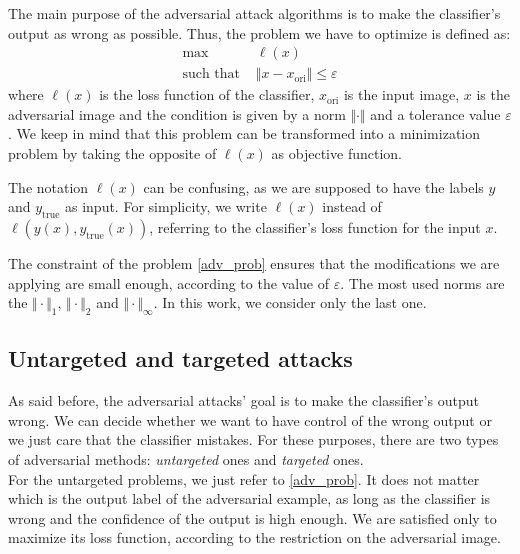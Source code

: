 \documentclass[10pt,twocolumn,letterpaper, english]{article}
\theoremstyle{definition}
\theoremstyle{plain}
\theoremstyle{plain}
\theoremstyle{plain}
\theoremstyle{plain}
\theoremstyle{remark}
\theoremstyle{remark}
\theoremstyle{definition}
\theoremstyle{definition}
\theoremstyle{definition}
\theoremstyle{definition}
\renewcommand{\epsilon}{\varepsilon}
\begin{document}
The main purpose of the adversarial attack algorithms is to make the classifier's output as wrong as possible. 
Thus, the problem we have to optimize is defined as: 
\begin{align}
    \max \, &\ell(x) \label{adv_prob} \\
    \text{such that } & \Vert x - x_{\text{ori}} \Vert \le \epsilon \nonumber
\end{align}
where $\ell(x)$ is the loss function of the classifier, $x_{\text{ori}}$ is the input image, $x$ is the adversarial image and the condition is given by a norm $\Vert \cdot \Vert$ and a tolerance value $\epsilon$. 
We keep in mind that this problem can be transformed into a minimization problem by taking the opposite of $\ell(x)$ as objective function. 

The notation $\ell(x)$ can be confusing, as we are supposed to have the labels $y$ and $y_{\text{true}}$ as input. 
For simplicity, we write $\ell(x)$ instead of $\ell(y(x), y_{\text{true}}(x))$, referring to the classifier's loss function for the input $x$. 

The constraint of the problem \ref{adv_prob} ensures that the modifications we are applying are small enough, according to the value of $\epsilon$. 
The most used norms are the $\Vert \cdot \Vert_1$, $\Vert \cdot \Vert_2$ and $\Vert \cdot \Vert_{\infty}$. 
In this work, we consider only the last one. 

\subsection{Untargeted and targeted attacks} 

As said before, the adversarial attacks' goal is to make the classifier's output wrong. 
We can decide whether we want to have control of the wrong output or we just care that the classifier mistakes. 
For these purposes, there are two types of adversarial methods: \textit{untargeted} ones and \textit{targeted} ones. \\ 

For the untargeted problems, we just refer to \ref{adv_prob}. 
It does not matter which is the output label of the adversarial example, as long as the classifier is wrong and the confidence of the output is high enough. 
We are satisfied only to maximize its loss function, according to the restriction on the adversarial image.\\
\end{document}
